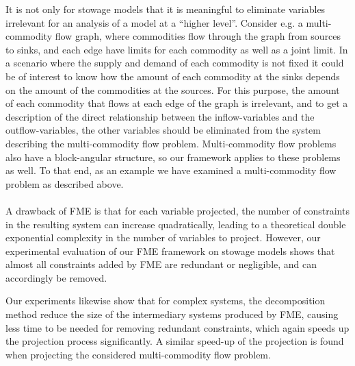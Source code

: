 It is not only for stowage models that it is meaningful to eliminate variables irrelevant for an analysis of a model at a ``higher level''. Consider e.g. a multi-commodity flow graph, where commodities flow through the graph from sources to sinks, and each edge have limits for each commodity as well as a joint limit. In a scenario where the supply and demand of each commodity is not fixed it could be of interest to know how the amount of each commodity at the sinks depends on the amount of the commodities at the sources. For this purpose, the amount of each commodity that flows at each edge of the graph is irrelevant, and to get a description of the direct relationship between the inflow-variables and the outflow-variables, the other variables should be eliminated from the system describing the multi-commodity flow problem.
Multi-commodity flow problems also have a block-angular structure, so our framework applies to these problems as well. To that end, as an example we have examined a multi-commodity flow problem as described above. %
\\\\
\noindent A drawback of FME is that for each variable projected, the number of constraints in the resulting system can increase quadratically, leading to a theoretical double exponential complexity in the number of variables to project. However, our experimental evaluation of our FME framework on stowage models shows that almost all constraints added by FME are redundant or negligible, and can accordingly be removed. 

Our experiments likewise show that for complex systems, the decomposition method reduce the size of the intermediary systems produced by FME, causing less time to be needed for removing redundant constraints, which again speeds up the projection process significantly. A similar speed-up of the projection is found when projecting the considered multi-commodity flow problem. %

